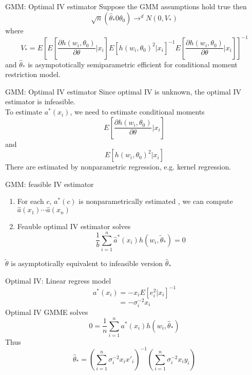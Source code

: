 \documentclass{beamer}
\begin{document}
\begin{frame}{GMM: Optimal IV estimator}
	Suppose the GMM assumptions hold true then 
	\[\sqrt{n}(\hat{\theta}_* 0 \theta_0) \rightarrow^d N(0,V_*)\]
	where
	\[V_* = E[E[\frac{\partial h(w_i,\theta_0)}{\partial \theta}|x_i] E[h(w_i,\theta_0)^2|x_i]^{-1} E[\frac{\partial h(w_i,\theta_0)}{\partial \theta}|x_i] ]^{-1}\]
	and $\hat{\theta}_*$ is asympototically semiparametric efficient for conditional moment restriction model.
\end{frame}
\begin{frame}{GMM: Optimal IV estimator}
	Since optimal IV is unknown, the optimal IV estimator is infeasible. \\
	To estimate $a^*(x_i)$, we need to estimate conditional moments
	\[E[\frac{\partial h(w_i,\theta_0)}{\partial \theta}|x_i]\]
	and
	\[E[h(w_i,\theta_0)^2|x_i]\]
	There are estimated by nonparametric regression, e.g. kernel regression.
\end{frame}
\begin{frame}{GMM: feasible IV estimator}
	\begin{enumerate}
		\item For each $c$, $a^*(c)$ is nonparametrically estimated , we can compute $\hat{a}(x_1) \cdots \hat{a}(x_n)$
		\item Feauble optimal IV estimator solves
			\[\frac{1}{b} \sum^n_{i=1} \hat{a}^*(x_i)h(w_i,\tilde{\theta}_*)=0\]
	\end{enumerate}
	$\tilde{\theta}$ is asymptotically equivalent to infeasible version $\hat{\theta}_*$
\end{frame}
\begin{frame}{Optimal IV: Linear regress model}
	\[a^*(x_i) = -x_iE[e^2_i|x_i]^{-1}\]
	\[= -\sigma^{-2}_i x_i\]
	Optimal IV GMME solves
	\[0 = \frac{1}{n} \sum^n_{i=1} a^*(x_i) h(w_i,\hat{\theta}_*)\]
	Thus
	\[\hat{\theta}_* = (\sum^n_{i=1} \sigma^{-2}_i x_ix'_i)^{-1}(\sum^n_{i=1} \sigma^{-2}_i x_i y_i)\]
\end{frame}
\end{document}
